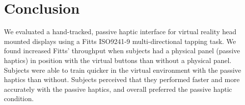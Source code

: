 \documentclass[]{aiaa-tc}%
\begin{document}
\section{Conclusion}

We evaluated a hand-tracked, passive haptic interface for virtual reality head mounted displays using a Fitts ISO9241-9 multi-directional tapping task.
We found increased Fitts' throughput when subjects had a physical panel (passive haptics) in position with the virtual buttons than without a physical panel.
Subjects were able to train quicker in the virtual environment with the passive haptics than without.
Subjects perceived that they performed faster and more accurately with the passive haptics, and overall preferred the passive haptic condition.



\end{document}
